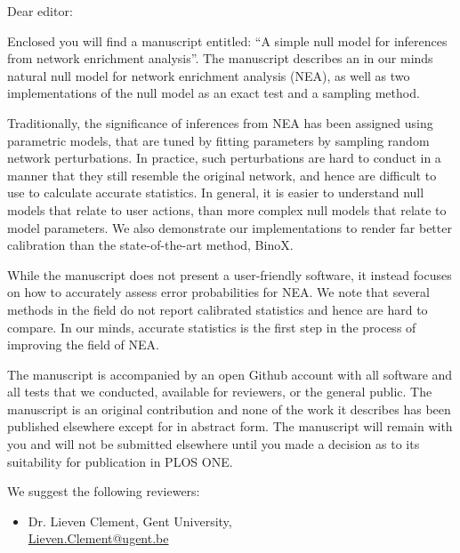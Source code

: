 \documentclass[a4paper]{letter}
\begin{document}
\begin{letter}{}
\vspace*{-5.0cm}

\opening{Dear editor:}

Enclosed you will find a manuscript entitled: ``A simple null model for inferences from network enrichment analysis''. The manuscript describes an in our minds natural null model for network enrichment analysis (NEA), as well as two implementations of the null model as an exact test and a sampling method.

Traditionally, the significance of inferences from NEA has been assigned using parametric models, that are tuned by fitting parameters by sampling random network perturbations.  In practice, such perturbations are hard to conduct in a manner that they still resemble the original network, and hence are difficult to use to calculate accurate statistics. In general, it is easier to understand null models that relate to user actions, than more complex null models that relate to model parameters. We also demonstrate our implementations to render far better calibration than the state-of-the-art method, BinoX.

\vspace{0.15cm}

While the manuscript does not present a user-friendly software, it instead focuses on how to accurately assess error probabilities for NEA. We note that several methods in the field do not report calibrated statistics and hence are hard to compare. In our minds, accurate statistics is the first step in the process of improving the field of NEA.

\vspace{0.15cm}

The manuscript is accompanied by an open Github account with all software and all tests that we conducted, available for reviewers, or the general public. The manuscript is an original contribution and none of the work it describes has been published elsewhere except for in abstract form. The manuscript will remain with you and will not be submitted elsewhere until you made a decision as to its suitability for publication in PLOS ONE.

We suggest the following reviewers:

\begin{itemize}

\item Dr. Lieven Clement,
Gent University, \\
\url{Lieven.Clement@ugent.be}


\end{itemize}
\end{letter}
\end{document}
